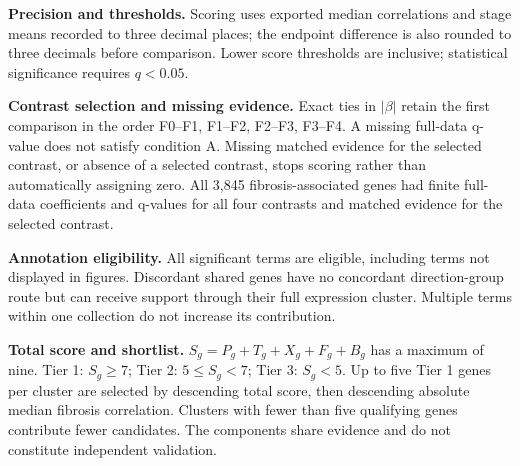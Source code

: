 \documentclass[11pt,a4paper]{article}
\begin{document}
\small
\textbf{Precision and thresholds.} Scoring uses exported median correlations and stage means recorded to three decimal places; the endpoint difference is also rounded to three decimals before comparison. Lower score thresholds are inclusive; statistical significance requires $q<0.05$.

\textbf{Contrast selection and missing evidence.} Exact ties in $|\beta|$ retain the first comparison in the order F0--F1, F1--F2, F2--F3, F3--F4. A missing full-data q-value does not satisfy condition A. Missing matched evidence for the selected contrast, or absence of a selected contrast, stops scoring rather than automatically assigning zero. All 3,845 fibrosis-associated genes had finite full-data coefficients and q-values for all four contrasts and matched evidence for the selected contrast.

\textbf{Annotation eligibility.} All significant terms are eligible, including terms not displayed in figures. Discordant shared genes have no concordant direction-group route but can receive support through their full expression cluster. Multiple terms within one collection do not increase its contribution.

\textbf{Total score and shortlist.} $S_g=P_g+T_g+X_g+F_g+B_g$ has a maximum of nine. Tier 1: $S_g\geq7$; Tier 2: $5\leq S_g<7$; Tier 3: $S_g<5$. Up to five Tier 1 genes per cluster are selected by descending total score, then descending absolute median fibrosis correlation. Clusters with fewer than five qualifying genes contribute fewer candidates. The components share evidence and do not constitute independent validation.
\endgroup
\end{document}
